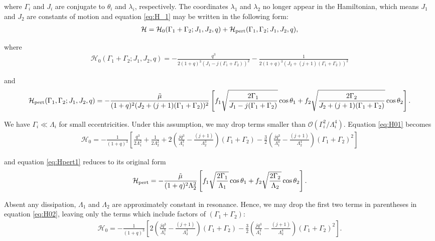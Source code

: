 \documentclass[usenatbib,onecolumn]{mnras}
\begin{document}
\noindent where \(\Gamma_i\) and \(J_i\) are conjugate to
\(\theta_i\) and \(\lambda_i\), respectively.
The coordinates \(\lambda_1\) and \(\lambda_2\)
no longer appear in the Hamiltonian,
which means \(J_1\) and \(J_2\) are constants of motion and
equation \eqref{eq:H_1} may be written
in the following form:
\begin{align}
\label{eq:H_2}
  \mathcal{H}
  = \mathcal{H}_0(\Gamma_1+\Gamma_2; J_1, J_2, q)
                  + \mathcal{H}_{\rm pert}(\Gamma_1,\Gamma_2; J_1, J_2, q),
\end{align}

\noindent
where
\begin{align}
  \label{eq:H01}
  \mathcal{H}_0(\Gamma_1+\Gamma_2; J_1, J_2, q)
  = -\frac{q^3}{2(1+q)^3(J_1-j(\Gamma_1+\Gamma_2))^2}
  -\frac{1}{2(1+q)^3(J_2+(j+1)(\Gamma_1+\Gamma_2))^2} 
\end{align}

\noindent
and
\begin{align}
  \label{eq:Hpert1}
  \mathcal{H}_{\rm pert}(\Gamma_1,\Gamma_2; J_1, J_2, q)
  = -\frac{\tilde\mu}{(1+q)^2(J_2+(j+1)(\Gamma_1+\Gamma_2))^2}
  \left[
    f_1\sqrt{\frac{2\Gamma_1}{J_1 - j(\Gamma_1+\Gamma_2)}}\cos\theta_1
  +f_2\sqrt{\frac{2\Gamma_2}{J_2 + (j+1)(\Gamma_1+\Gamma_2)}}\cos\theta_2
    \right].
\end{align}

\noindent We have \(\Gamma_i \ll \Lambda_i\) for small
eccentricities.  Under this assumption, we may drop terms smaller than
\(\mathcal{O}(\Gamma_i^2/\Lambda_i^4)\).  Equation \eqref{eq:H01} becomes
\begin{align}
  \label{eq:H02}
  \mathcal{H}_0
  = -\frac{1}{(1+q)^3}\left[
     \frac{q^3}{2\Lambda_1^2} + \frac{1}{2\Lambda_2^2}
   + 2\left(
     \frac{jq^3}{\Lambda_1^3} - \frac{(j+1)}{\Lambda_2^3}
     \right)(\Gamma_1+\Gamma_2)
   -\frac32\left( 
     \frac{jq^3}{\Lambda_1^4} - \frac{(j+1)}{\Lambda_2^4}\right)
     (\Gamma_1+\Gamma_2)^2
     \right]
\end{align}

\noindent
and equation \eqref{eq:Hpert1} reduces to its original form
\begin{align}
\label{eq:H_3}
  \mathcal{H}_{\rm pert}
  =-\frac{\tilde\mu}{(1+q)^2\Lambda_2^2}
  \left[
  f_1\sqrt{\frac{2\Gamma_1}{\Lambda_1}}\cos\theta_1
  +f_2\sqrt{\frac{2\Gamma_2}{\Lambda_2}}\cos\theta_2
  \right].
\end{align}

\noindent Absent any dissipation, \(\Lambda_1\) and
\(\Lambda_2\) are approximately constant in resonance.  Hence, we may
drop the first two terms in parentheses in equation \eqref{eq:H02},
leaving only the terms which include factors of \((\Gamma_1+\Gamma_2)\):
\begin{align}
  \label{eq:H03}
  \mathcal{H}_0
  = -\frac{1}{(1+q)^3}\left[
   2\left(
     \frac{jq^3}{\Lambda_1^3} - \frac{(j+1)}{\Lambda_2^3}
     \right)(\Gamma_1+\Gamma_2)
   -\frac32\left( 
     \frac{jq^3}{\Lambda_1^4} - \frac{(j+1)}{\Lambda_2^4}\right)
     (\Gamma_1+\Gamma_2)^2
     \right].
\end{align}
\end{document}
